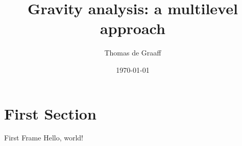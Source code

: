 \documentclass{beamer}
\title{Gravity analysis: a multilevel approach}
\date{\today}
\author{Thomas de Graaff}
\institute{Vrije Universiteit Amsterdam\\Department of Spatial Economics}
\begin{document}
  \maketitle
  \section{First Section}
  \begin{frame}{First Frame}
    Hello, world!
  \end{frame}
\end{document}

